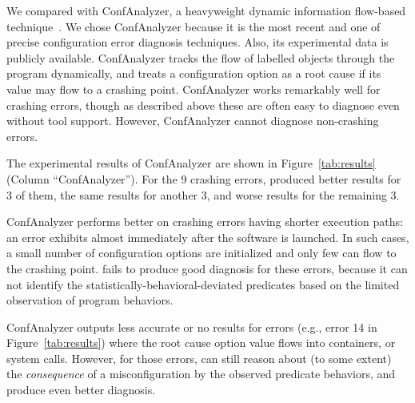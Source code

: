 We compared \ourtool with ConfAnalyzer, a heavyweight dynamic information
flow-based technique~\cite{Rabkin:2011:PPC}.
We chose ConfAnalyzer because it is the most recent and one of precise configuration
error diagnosis techniques. Also, its 
experimental data is publicly available.
ConfAnalyzer tracks the flow of labelled objects through the
program dynamically,
and treats a configuration option as a root cause if its
value may flow to a crashing point.
ConfAnalyzer works remarkably well for crashing errors, though as
described above these are often easy to diagnose even without tool
support. However, ConfAnalyzer cannot diagnose non-crashing errors.

The experimental results of ConfAnalyzer are shown in Figure~\ref{tab:results} (Column ``ConfAnalyzer'').
For the 9 crashing errors, \ourtool produced better results for 3 of them,
the same results for another 3, and worse results for the remaining 3.

ConfAnalyzer performs better on crashing errors
having shorter execution paths: an error exhibits
almost immediately after the software is launched.
In such cases, a small number of configuration options are initialized and
only few can flow to the crashing point. 
\ourtool fails to produce good diagnosis for these errors, because it can not identify
 the statistically-behavioral-deviated predicates based on the limited
observation of program behaviors.

ConfAnalyzer outputs less accurate or no results
for errors (e.g., error 14 in Figure~\ref{tab:results}) where the root cause option value
flows into containers, or system calls. However, for those errors,
\ourtool can still reason about (to some extent) the \textit{consequence} of a misconfiguration
by the observed predicate behaviors, and produce even better diagnosis.






